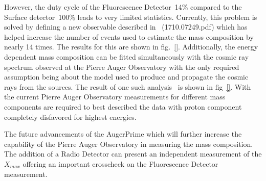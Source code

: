 However, the duty cycle of the Fluorescence Detector~14\% compared to the Surface detector~100\% leads to very limited statistics. Currently, this problem is solved by defining a new observable described in ~\cite{}(1710.07249.pdf) which has helped increase the number of events used to estimate the mass composition by nearly 14 times. The results for this are shown in fig.~\ref{}. Additionally, the energy dependent mass composition can be fitted simultaneously with the cosmic ray spectrum observed at the Pierre Auger Observatory with the only required assumption being about the model used to produce and propagate the cosmic rays from the sources. The result of one such analysis~\cite{} is shown in fig~\ref{}. With the current Pierre Auger Observatory measurements for different mass components are required to best described the data with proton component completely disfavored for highest energies.   

The future advancements of the AugerPrime which will further increase the capability of the Pierre Auger Observatory in measuring the mass composition. The addition of a Radio Detector can present an independent measurement of the $X_{max}$ offering an important crosscheck on the Fluorescence Detector measurement. 

